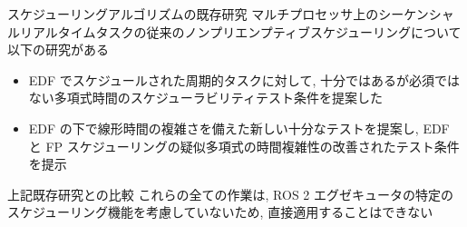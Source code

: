 \begin{frame}{スケジューリングアルゴリズムの既存研究}
    マルチプロセッサ上のシーケンシャルリアルタイムタスクの従来のノンプリエンプティブスケジューリングについて以下の研究がある
    \begin{itemize}
        \item EDF でスケジュールされた周期的タスクに対して, 十分ではあるが必須ではない多項式時間のスケジューラビリティテスト条件を提案した \cite{baruah2006non}
        \item EDF の下で線形時間の複雑さを備えた新しい十分なテストを提案し, EDF と FP スケジューリングの疑似多項式の時間複雑性の改善されたテスト条件を提示 \cite{guan2008new}
    \end{itemize}
\end{frame}

\begin{frame}{上記既存研究との比較}
    これらの全ての作業は, ROS 2 エグゼキュータの特定のスケジューリング機能を考慮していないため, 直接適用することはできない
\end{frame}
